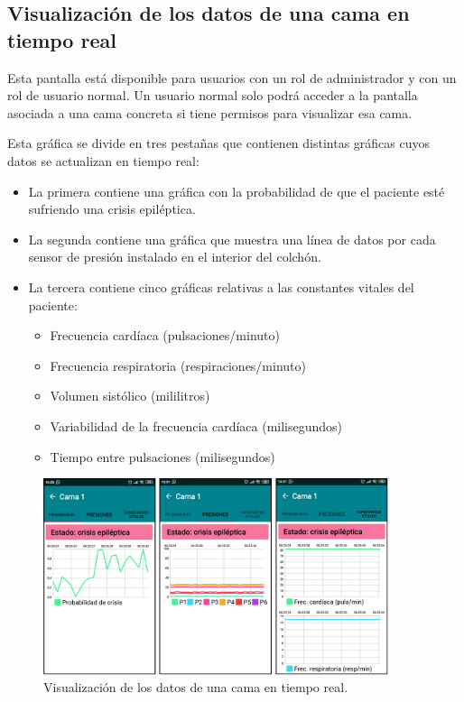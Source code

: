 \subsection{Visualización de los datos de una cama en tiempo real}

Esta pantalla está disponible para usuarios con un rol de administrador y con un rol de usuario normal. Un usuario normal solo podrá acceder a la pantalla asociada a una cama concreta si tiene permisos para visualizar esa cama. 

Esta gráfica se divide en tres pestañas que contienen distintas gráficas cuyos datos se actualizan en tiempo real: 

\begin{itemize}
	\item La primera contiene una gráfica con la probabilidad de que el paciente esté sufriendo una crisis epiléptica. 
	\item La segunda contiene una gráfica que muestra una línea de datos por cada sensor de presión instalado en el interior del colchón. 
	\item La tercera contiene cinco gráficas relativas a las constantes vitales del paciente: 
	\begin{itemize}
		\item Frecuencia cardíaca (pulsaciones/minuto)
		\item Frecuencia respiratoria (respiraciones/minuto)
		\item Volumen sistólico (mililitros)
		\item Variabilidad de la frecuencia cardíaca (milisegundos)
		\item Tiempo entre pulsaciones (milisegundos)
	\end{itemize}
\end{itemize}

\begin{figure}[H]
	\centering
	\includegraphics[width=0.9\textwidth]{../img/datoscama.png}
	\caption{Visualización de los datos de una cama en tiempo real.}
	\label{fig:datoscama}
\end{figure}

